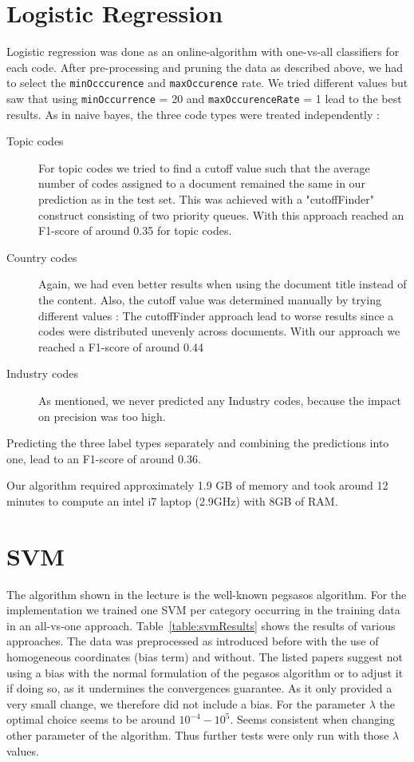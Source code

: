 \documentclass{article}
\begin{document}
\section*{Logistic Regression}
    Logistic regression was done as an online-algorithm with one-vs-all classifiers for each code. After pre-processing and pruning the data as described above, we had to select the \texttt{minOcccurence} and \texttt{maxOccurence} rate. We tried different values but saw that using \texttt{minOccurrence} = 20 and \texttt{maxOccurenceRate} = 1 lead to the best results.
    As in naive bayes, the three code types were treated independently :
    \begin{description}
    \item[Topic codes] For topic codes we tried to find a cutoff value such that the average number of codes assigned to a document remained the same in our prediction as in the test set. This was achieved with a "cutoffFinder" construct consisting of two priority queues. With this approach reached an F1-score of around 0.35 for topic codes.
    \item[Country codes] Again,  we had even better results when using the document title instead of the content. Also, the cutoff value was determined manually by trying different values : The cutoffFinder approach lead to worse results since a codes were distributed unevenly across documents. With our approach we reached a F1-score of around 0.44
    \item[Industry codes] As mentioned, we never predicted any Industry codes, because the impact on precision was too high.
    \end{description}

    Predicting the three label types separately and combining the predictions into one, lead to an F1-score of around 0.36.

    Our algorithm required approximately 1.9 GB of memory and took around 12 minutes to compute an intel i7 laptop (2.9GHz) with 8GB of RAM.

\section*{SVM}
The algorithm shown in the lecture is the well-known pegsasos algorithm\cite{shalev-shwartz_pegasos:_2011,shalev-shwartz_pegasos:_????}. For the implementation we trained one SVM per category occurring in the training data in an all-vs-one approach.
Table~\ref{table:svmResults} shows the results of various approaches.
The data was preprocessed as introduced before with the use of homogeneous coordinates (bias term) and without. The listed papers suggest not using a bias with the normal formulation of the pegasos algorithm or to adjust it if doing so, as it undermines the convergences guarantee. As it only provided a very small change, we therefore did not include a bias. For the parameter $\lambda$ the optimal choice seems to be around $10^{-4} - 10^{5}$. Seems consistent when changing other parameter of the algorithm. Thus further tests were only run with those $\lambda$ values.
\end{document}
